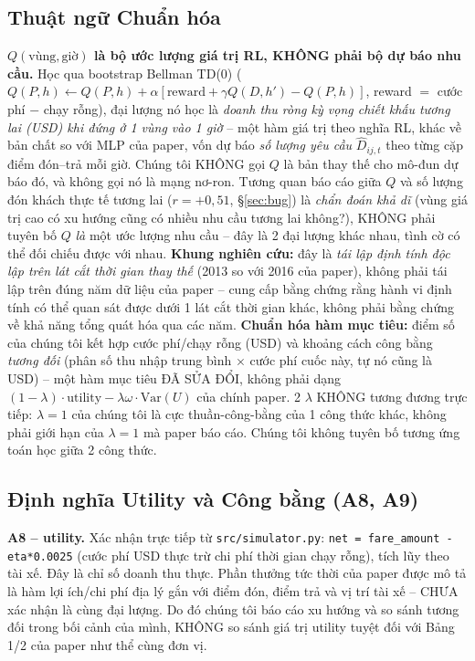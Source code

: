 \documentclass[10pt,twocolumn,a4paper]{article}
\begin{document}
\subsection{Thuật ngữ Chuẩn hóa}
\label{sec:terminology}
\textbf{$Q(\text{vùng},\text{giờ})$ là bộ ước lượng giá trị RL, KHÔNG phải
bộ dự báo nhu cầu.} Học qua bootstrap Bellman TD(0)
($Q(P,h)\leftarrow Q(P,h)+\alpha[\text{reward}+\gamma Q(D,h')-Q(P,h)]$,
reward $=$ cước phí $-$ chạy rỗng), đại lượng nó học là \emph{doanh thu
ròng kỳ vọng chiết khấu tương lai (USD) khi đứng ở 1 vùng vào 1 giờ} -- một
hàm giá trị theo nghĩa RL, khác về bản chất so với MLP của paper, vốn dự
báo \emph{số lượng yêu cầu} $\hat D_{ij,t}$ theo từng cặp điểm đón--trả mỗi
giờ. Chúng tôi KHÔNG gọi $Q$ là bản thay thế cho mô-đun dự báo đó, và không
gọi nó là mạng nơ-ron. Tương quan báo cáo giữa $Q$ và số lượng đón khách
thực tế tương lai ($r=+0,51$, \S\ref{sec:bug}) là \emph{chẩn đoán khả dĩ}
(vùng giá trị cao có xu hướng cũng có nhiều nhu cầu tương lai không?),
KHÔNG phải tuyên bố $Q$ \emph{là} một ước lượng nhu cầu -- đây là 2 đại
lượng khác nhau, tình cờ có thể đối chiếu được với nhau.
\textbf{Khung nghiên cứu:} đây là \emph{tái lập định tính độc lập trên lát
cắt thời gian thay thế} (2013 so với 2016 của paper), không phải tái lập
trên đúng năm dữ liệu của paper -- cung cấp bằng chứng rằng hành vi định
tính có thể quan sát được dưới 1 lát cắt thời gian khác, không phải bằng
chứng về khả năng tổng quát hóa qua các năm.
\textbf{Chuẩn hóa hàm mục tiêu:} điểm số của chúng tôi kết hợp cước
phí/chạy rỗng (USD) và khoảng cách công bằng \emph{tương đối} (phân số thu
nhập trung bình $\times$ cước phí cuốc này, tự nó cũng là USD) -- một hàm
mục tiêu ĐÃ SỬA ĐỔI, không phải dạng
$(1-\lambda)\cdot\text{utility}-\lambda\omega\cdot\text{Var}(U)$ của
chính paper. 2 $\lambda$ KHÔNG tương đương trực tiếp: $\lambda=1$ của
chúng tôi là cực thuần-công-bằng của 1 công thức khác, không phải giới hạn
của $\lambda=1$ mà paper báo cáo. Chúng tôi không tuyên bố tương ứng toán
học giữa 2 công thức.

\subsection{Định nghĩa Utility và Công bằng (A8, A9)}
\textbf{A8 -- utility.} Xác nhận trực tiếp từ \texttt{src/simulator.py}:
\texttt{net = fare\_amount - eta*0.0025} (cước phí USD thực trừ chi phí
thời gian chạy rỗng), tích lũy theo tài xế. Đây là chỉ số doanh thu thực.
Phần thưởng tức thời của paper được mô tả là hàm lợi ích/chi phí địa lý gắn
với điểm đón, điểm trả và vị trí tài xế -- CHƯA xác nhận là cùng đại
lượng. Do đó chúng tôi báo cáo xu hướng và so sánh tương đối trong bối
cảnh của mình, KHÔNG so sánh giá trị utility tuyệt đối với Bảng 1/2 của
paper như thể cùng đơn vị.
\end{document}
